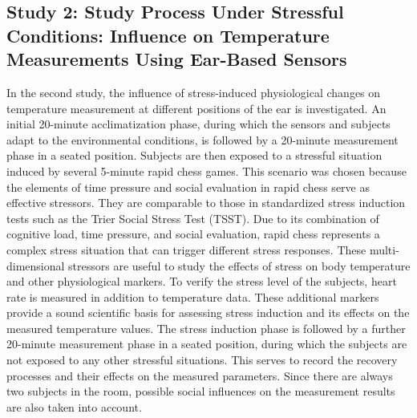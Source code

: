 \subsection{Study 2: Study Process Under Stressful Conditions: Influence on Temperature Measurements Using Ear-Based Sensors}
\label{ch:Design:Study:Study2}
In the second study, the influence of stress-induced physiological changes on temperature measurement at different positions of the ear is investigated. 
An initial 20-minute acclimatization phase, during which the sensors and subjects adapt to the environmental conditions, is followed by a 20-minute measurement phase in a seated position. 
Subjects are then exposed to a stressful situation induced by several 5-minute rapid chess games.
This scenario was chosen because the elements of time pressure and social evaluation in rapid chess serve as effective stressors. 
They are comparable to those in standardized stress induction tests such as the Trier Social Stress Test (TSST). 
Due to its combination of cognitive load, time pressure, and social evaluation, rapid chess represents a complex stress situation that can trigger different stress responses. 
These multi-dimensional stressors are useful to study the effects of stress on body temperature and other physiological markers.
To verify the stress level of the subjects, heart rate is measured in addition to temperature data. 
These additional markers provide a sound scientific basis for assessing stress induction and its effects on the measured temperature values.
The stress induction phase is followed by a further 20-minute measurement phase in a seated position, during which the subjects are not exposed to any other stressful situations. 
This serves to record the recovery processes and their effects on the measured parameters. 
Since there are always two subjects in the room, possible social influences on the measurement results are also taken into account.